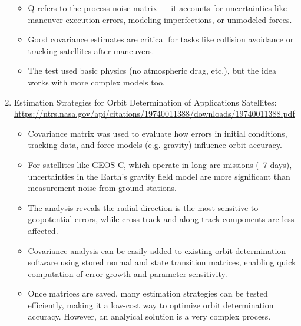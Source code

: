 \documentclass[12pt]{report}
\begin{document}
\begin{enumerate}
\begin{itemize}
\begin{itemize}
    \end{itemize}
    \item Q refers to the process noise matrix — it accounts for uncertainties like maneuver execution errors, modeling imperfections, or unmodeled forces.
    \item Good covariance estimates are critical for tasks like collision avoidance or tracking satellites after maneuvers.
    \item The test used basic physics (no atmospheric drag, etc.), but the idea works with more complex models too.
  \end{itemize}

  \item Estimation Strategies for Orbit Determination of Applications Satellites: \url{https://ntrs.nasa.gov/api/citations/19740011388/downloads/19740011388.pdf}

  \begin{itemize}
    \item Covariance matrix was used to evaluate how errors in initial conditions, tracking data, and force models (e.g. gravity) influence orbit accuracy.
    \item For satellites like GEOS-C, which operate in long-arc missions (~7 days), uncertainties in the Earth’s gravity field model are more significant than measurement noise from ground stations.
    \item The analysis reveals the radial direction is the most sensitive to geopotential errors, while cross-track and along-track components are less affected.
    \item Covariance analysis can be easily added to existing orbit determination software using stored normal and state transition matrices, enabling quick computation of error growth and parameter sensitivity.
    \item Once matrices are saved, many estimation strategies can be tested efficiently, making it a low-cost way to optimize orbit determination accuracy. However, an analyical solution is a very complex process.
  \end{itemize}


\end{enumerate}
\end{document}
